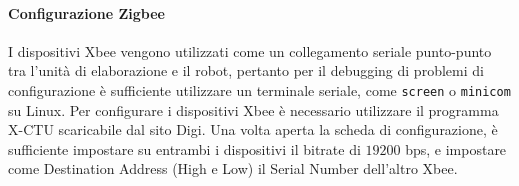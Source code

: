 \paragraph{Configurazione Zigbee} I dispositivi Xbee vengono utilizzati come un collegamento seriale punto-punto tra l'unità di elaborazione e il robot, pertanto per il debugging di problemi di configurazione è sufficiente utilizzare un terminale seriale, come \verb|screen| o \verb|minicom| su Linux. Per configurare i dispositivi Xbee è necessario utilizzare il programma X-CTU scaricabile dal sito Digi. Una volta aperta la scheda di configurazione, è sufficiente impostare su entrambi i dispositivi il bitrate di $19200$ bps, e impostare come Destination Address (High e Low) il Serial Number dell'altro Xbee.
